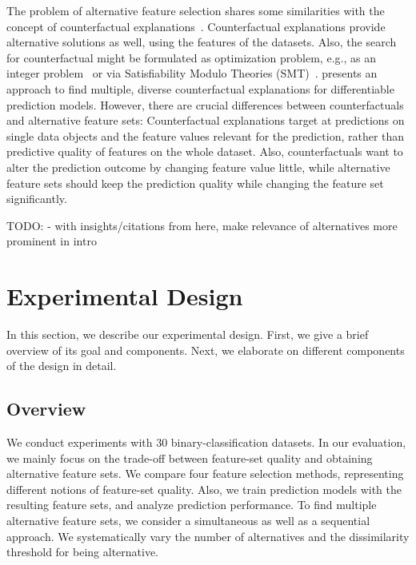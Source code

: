 \documentclass{article}
\theoremstyle{definition}
\begin{document}
The problem of alternative feature selection shares some similarities with the concept of counterfactual explanations~\cite{verma2020counterfactual, stepin2021survey}.
Counterfactual explanations provide alternative solutions as well, using the features of the datasets.
Also, the search for counterfactual might be formulated as optimization problem, e.g., as an integer problem~\cite{mohammadi2021scaling} or via Satisfiability Modulo Theories (SMT)~\cite{karimi2020model}.
\cite{mothilal2020explaining} presents an approach to find multiple, diverse counterfactual explanations for differentiable prediction models.
However, there are crucial differences between counterfactuals and alternative feature sets:
Counterfactual explanations target at predictions on single data objects and the feature values relevant for the prediction, rather than predictive quality of features on the whole dataset.
Also, counterfactuals want to alter the prediction outcome by changing feature value little, while alternative feature sets should keep the prediction quality while changing the feature set significantly.

TODO:
- with insights/citations from here, make relevance of alternatives more prominent in intro

\section{Experimental Design}
\label{sec:experimental-design}

In this section, we describe our experimental design.
First, we give a brief overview of its goal and components.
Next, we elaborate on different components of the design in detail.

\subsection{Overview}
\label{sec:experimental-design:overview}

We conduct experiments with 30 binary-classification datasets.
In our evaluation, we mainly focus on the trade-off between feature-set quality and obtaining alternative feature sets.
We compare four feature selection methods, representing different notions of feature-set quality.
Also, we train prediction models with the resulting feature sets, and analyze prediction performance.
To find multiple alternative feature sets, we consider a simultaneous as well as a sequential approach.
We systematically vary the number of alternatives and the dissimilarity threshold for being alternative.
\end{document}

